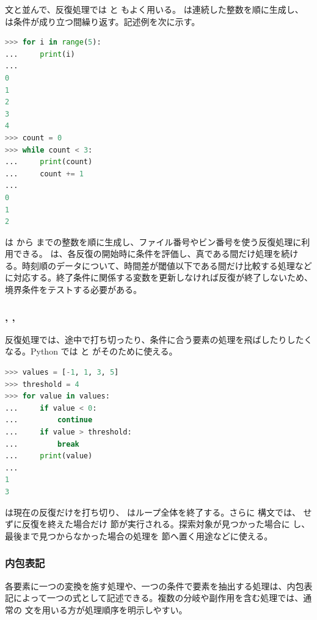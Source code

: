  文と並んで、反復処理では  と  もよく用いる。 は連続した整数を順に生成し、 は条件が成り立つ間繰り返す。記述例を次に示す。

\begin{lstlisting}[language=Python, numbers=none, xleftmargin=2\zw]
>>> for i in range(5):
...     print(i)
...
0
1
2
3
4
>>> count = 0
>>> while count < 3:
...     print(count)
...     count += 1
...
0
1
2
\end{lstlisting}

 は  から  までの整数を順に生成し、ファイル番号やビン番号を使う反復処理に利用できる。 は、各反復の開始時に条件を評価し、真である間だけ処理を続ける。時刻順のデータについて、時間差が閾値以下である間だけ比較する処理などに対応する。終了条件に関係する変数を更新しなければ反復が終了しないため、境界条件をテストする必要がある。

\subsubsection{, , }

反復処理では、途中で打ち切ったり、条件に合う要素の処理を飛ばしたりしたくなる。Python では  と  がそのために使える。

\begin{lstlisting}[language=Python, numbers=none, xleftmargin=2\zw]
>>> values = [-1, 1, 3, 5]
>>> threshold = 4
>>> for value in values:
...     if value < 0:
...         continue
...     if value > threshold:
...         break
...     print(value)
...
1
3
\end{lstlisting}

 は現在の反復だけを打ち切り、 はループ全体を終了する。さらに  構文では、 せずに反復を終えた場合だけ  節が実行される。探索対象が見つかった場合に  し、最後まで見つからなかった場合の処理を  節へ置く用途などに使える。

\subsubsection{内包表記}

各要素に一つの変換を施す処理や、一つの条件で要素を抽出する処理は、内包表記によって一つの式として記述できる。複数の分岐や副作用を含む処理では、通常の  文を用いる方が処理順序を明示しやすい。

